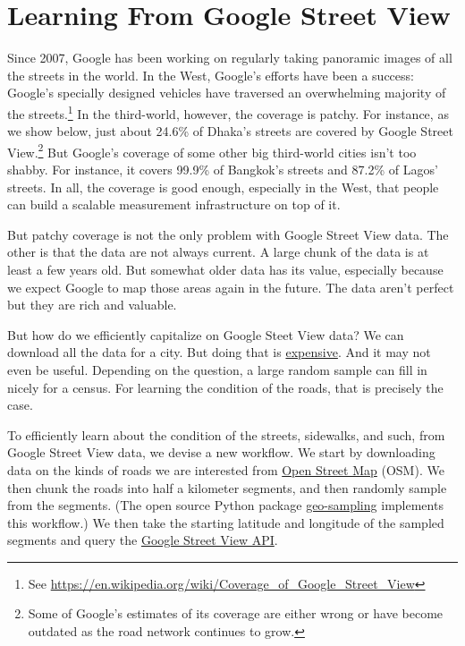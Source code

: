 \documentclass[12pt, letterpaper]{article}
\begin{document}
\section*{Learning From Google Street View}

Since 2007, Google has been working on regularly taking panoramic images of all the streets in the world. In the West, Google's efforts have been a success: Google's specially designed vehicles have traversed an overwhelming majority of the streets.\footnote{See \href{https://en.wikipedia.org/wiki/Coverage\_of\_Google\_Street\_View}{https://en.wikipedia.org/wiki/Coverage\_of\_Google\_Street\_View}} In the third-world, however, the coverage is patchy. For instance, as we show below, just about 24.6\% of Dhaka's streets are covered by Google Street View.\footnote{Some of Google's estimates of its coverage are either wrong or have become outdated as the road network continues to grow.} But Google's coverage of some other big third-world cities isn't too shabby. For instance, it covers 99.9\% of Bangkok's streets and 87.2\% of Lagos' streets. In all, the coverage is good enough, especially in the West, that people can build a scalable measurement infrastructure on top of it.

But patchy coverage is not the only problem with Google Street View data. The other is that the data are not always current. A large chunk of the data is at least a few years old. But somewhat older data has its value, especially because we expect Google to map those areas again in the future. The data aren't perfect but they are rich and valuable. 

But how do we efficiently capitalize on Google Steet View data? We can download all the data for a city. But doing that is \href{https://developers.google.com/maps/documentation/streetview/usage-and-billing}{expensive}. And it may not even be useful. Depending on the question, a large random sample can fill in nicely for a census. For learning the condition of the roads, that is precisely the case.

To efficiently learn about the condition of the streets, sidewalks, and such, from Google Street View data, we devise a new workflow. We start by downloading data on the kinds of roads we are interested from \href{https://www.openstreetmap.org}{Open Street Map} (OSM). We then chunk the roads into half a kilometer segments, and then randomly sample from the segments. (The open source Python package \href{https://github.com/geosensing/geo_sampling}{geo-sampling} \citep{laoha2017} implements this workflow.) We then take the starting latitude and longitude of the sampled segments and query the \href{https://developers.google.com/maps/documentation/streetview/intro}{Google Street View API}.
\end{document}

